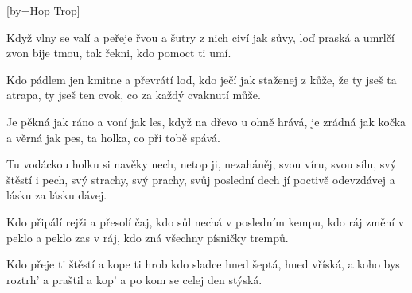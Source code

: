 [by={Hop Trop}]

\beginverse{}
Když vlny se valí a peřeje řvou
a šutry z nich civí jak sůvy,
loď praská a umrlčí zvon bije tmou,
tak řekni, kdo pomoct ti umí.
\endverse{}

\beginverse*{}
Kdo pádlem jen kmitne a převrátí loď,
kdo ječí jak staženej z kůže,
že ty jseš ta atrapa, ty jseš ten cvok,
co za každý cvaknutí může.
\endverse{}

\beginverse{}
Je pěkná jak ráno a voní jak les,
když na dřevo u ohně hrává,
je zrádná jak kočka a věrná jak pes,
ta holka, co při tobě spává.
\endverse{}

\beginchorus{}
Tu vodáckou holku si navěky nech,
netop ji, nezaháněj,
svou víru, svou sílu, svý štěstí i pech,
svý strachy, svý prachy, svůj poslední dech
jí poctivě odevzdávej
a lásku za lásku dávej.
\endchorus{}

\beginverse{}
Kdo připálí rejži a přesolí čaj,
kdo sůl nechá v posledním kempu,
kdo ráj změní v peklo a peklo zas v ráj,
kdo zná všechny písničky trempů.
\endverse{}

\beginverse*{}
Kdo přeje ti štěstí a kope ti hrob
kdo sladce hned šeptá, hned vříská,
a koho bys roztrh' a praštil a kop'
a po kom se celej den stýská.
\endverse{}

